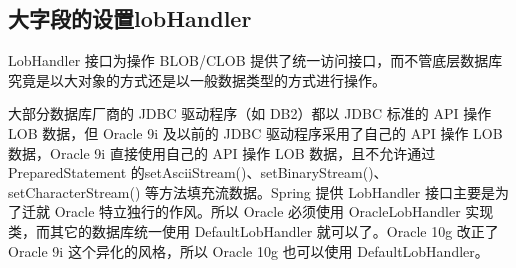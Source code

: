 \documentclass[letterpaper,10pt,english]{sphinxmanual}
\begin{document}
\subsection{大字段的设置\sphinxhyphen{}\sphinxhyphen{}lobHandler}
\label{\detokenize{interface/spring-jdbc:lobhandler}}
LobHandler 接口为操作 BLOB/CLOB 提供了统一访问接口，而不管底层数据库究竟是以大对象的方式还是以一般数据类型的方式进行操作。

大部分数据库厂商的 JDBC 驱动程序（如 DB2）都以 JDBC 标准的 API 操作 LOB 数据，但 Oracle 9i 及以前的 JDBC 驱动程序采用了自己的 API 操作 LOB 数据，Oracle 9i 直接使用自己的 API 操作 LOB 数据，且不允许通过 PreparedStatement 的setAsciiStream()、setBinaryStream()、setCharacterStream() 等方法填充流数据。Spring 提供 LobHandler 接口主要是为了迁就 Oracle 特立独行的作风。所以 Oracle 必须使用 OracleLobHandler 实现类，而其它的数据库统一使用 DefaultLobHandler 就可以了。Oracle 10g 改正了 Oracle 9i 这个异化的风格，所以 Oracle 10g 也可以使用 DefaultLobHandler。


\begin{sphinxVerbatim}[commandchars=\\\{\}]
 
 
     
\end{sphinxVerbatim}


\begin{sphinxVerbatim}[commandchars=\\\{\}]
 
  
\end{sphinxVerbatim}
\end{document}
